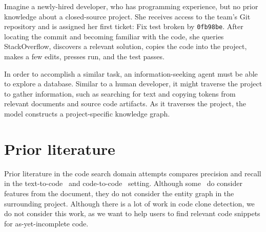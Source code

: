 \documentclass[11pt]{article}
\begin{document}
Imagine a newly-hired developer, who has programming experience, but no prior knowledge about a closed-source project. She receives access to the team's Git repository and is assigned her first ticket: Fix test broken by \texttt{0fb98be}. After locating the commit and becoming familiar with the code, she queries StackOverflow, discovers a relevant solution, copies the code into the project, makes a few edits, presses run, and the test passes.

In order to accomplish a similar task, an information-seeking agent must be able to explore a database. Similar to a human developer, it might traverse the project to gather information, such as searching for text and copying tokens from relevant documents and source code artifacts. As it traverses the project, the model constructs a project-specific knowledge graph.



\section{Prior literature}

Prior literature in the code search domain attempts compares precision and recall in the text-to-code~\citep{husain2019codesearchnet} and code-to-code~\citep{kim2018facoy} setting. Although some~\citep{asyrofi2020ausearch} do consider features from the document, they do not consider the entity graph in the surrounding project. Although there is a lot of work in code clone detection, we do not consider this work, as we want to help users to find relevant code snippets for as-yet-incomplete code.
\end{document}

